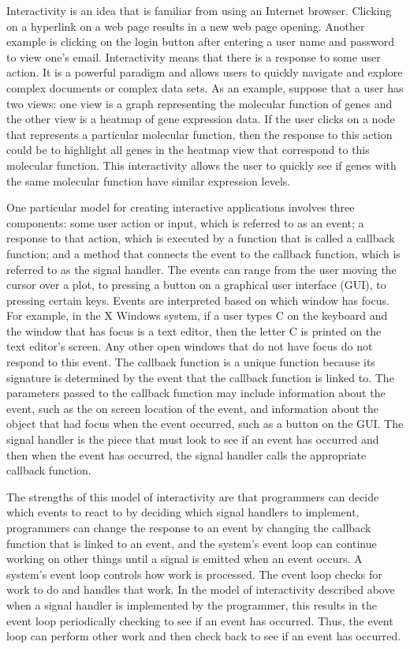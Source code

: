 \documentclass{article}[11pt]
\begin{document}
Interactivity is an idea that is familiar from using an Internet browser.
Clicking on a hyperlink on a web page results in a new web page
opening.  Another example is clicking on the login button after entering a
user name and password to view one's email.  Interactivity means that there is
a response to some user action.  It is a powerful paradigm and allows users to
quickly navigate and explore complex documents or complex data sets.  As an
example, suppose that a user has two views: one view is a graph representing
the molecular function of genes and the other view is a heatmap of gene
expression data.  If the user clicks on a node that represents a particular
molecular function, then the response to this action could be to highlight all
genes in the heatmap view that correspond to this molecular function.  This
interactivity allows the user to quickly see if genes with the same molecular
function have similar expression levels. 

One particular model for creating interactive applications involves three
components: some user action or input, which is referred to as an event;
a response to that action, which is executed by a function that is called
a callback function; and a method that connects the event to the callback
function, which is referred to as the signal handler.  The events can
range from the user moving the cursor over a plot, to pressing a button on a
graphical user interface (GUI), to pressing certain keys.  Events are
interpreted based on which window has focus.  For example, in the X Windows
system, if a user types C on the keyboard and the window that has focus is a
text editor, then the letter C is printed on the text editor's screen.
Any other open windows that do not have focus do not respond to this event.
The callback function is a unique function because its signature is determined
by the event that the callback function is linked to.  The parameters passed
to the callback function may include information about the event, such as the
on screen location of the event, and information about the object that had
focus when the event occurred, such as a button on the GUI.  The signal
handler is the piece that must look to see if an event has occurred and then
when the event has occurred, the signal handler calls the appropriate callback
function. 

The strengths of this model of interactivity are that programmers can decide
which events to react to by deciding which signal handlers to implement,
programmers can change the response to an event by changing the callback
function that is linked to an event, and the system's event loop can continue
working on other things until a signal is emitted when an event occurs.  A
system's event loop controls how work is processed.  The event loop checks for
work to do and handles that work.  In the model of interactivity described
above when a signal handler is implemented by the programmer, this results in
the event loop periodically checking to see if an event has occurred.  Thus,
the event loop can perform other work and then check back to see if an event
has occurred.
\end{document}
